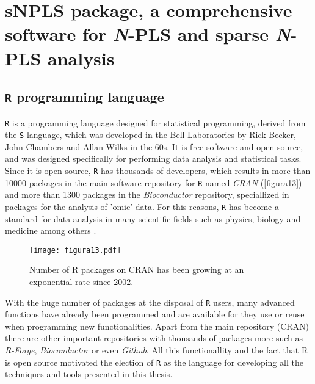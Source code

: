 
\chapter[sNPLS package, a comprehensive software for N-PLS and sparse N-PLS analysis]{sNPLS package, a comprehensive software for \textit{N}-PLS and sparse \textit{N}-PLS analysis}
\label{chapter:package}


\section{\texttt{R} programming language}
\texttt{R} \parencite{ihaka1996r, rsoftware} is a programming language designed for statistical programming, derived from the \texttt{S} language, which was developed in the Bell Laboratories by Rick Becker, John Chambers and Allan Wilks in the 60s. It is free software and open source, and was designed specifically for performing data analysis and statistical tasks. Since it is open source, \texttt{R} has thousands of developers, which results in more than 10000 packages in the main software repository for \texttt{R} named \textit{CRAN} (\autoref{figura13}) and more than 1300 packages in the \textit{Bioconductor} repository, speciallized in packages for the analysis of 'omic' data. For this reasons, \texttt{R} has become a standard for data analysis in many scientific fields such as physics, biology and medicine among others \parencite{goztepe4facto}. 

\begin{figure}[hbtp]
	\centering
\texttt{[image: figura13.pdf]}
\caption[Number of R packages on CRAN since 2002]{Number of R packages on CRAN has been growing at an exponential rate since 2002.}
\label{figura13}
\end{figure}

With the huge number of packages at the disposal of \texttt{R} users, many advanced functions have already been programmed and are available for they use or reuse when programming new functionalities. Apart from the main repository (CRAN) there are other important repositories with thousands of packages more such as \textit{R-Forge}, \textit{Bioconductor} or even \textit{Github}. All this functionallity and the fact that R is open source motivated the election of \texttt{R} as the language for developing all the techniques and tools presented in this thesis.

